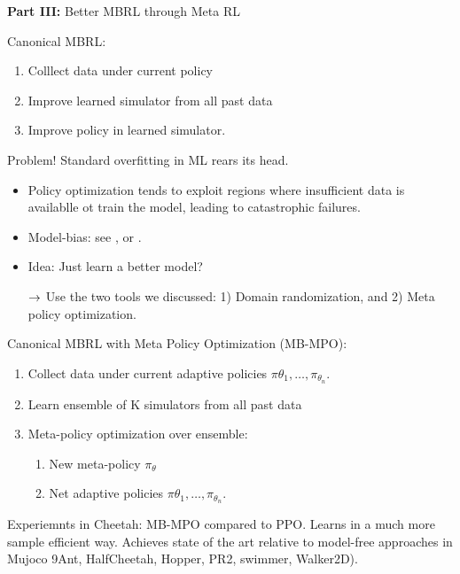 {\bf Part III:} Better MBRL through Meta RL \\


Canonical MBRL:
\begin{enumerate}
    \item Colllect data under current policy
    \item Improve learned simulator from all past data
    \item Improve policy in learned simulator.
\end{enumerate}

Problem! Standard overfitting in ML rears its head.
\begin{itemize}
    \item Policy optimization tends to exploit regions where insufficient data is availablle ot train the model, leading to catastrophic failures.
    
    \item Model-bias: see \citet{atkeson1997comparison}, or \citet{deisenroth2011pilco}.
    \item Idea: Just learn a better model?
    
    $\rightarrow$ Use the two tools we discussed: 1) Domain randomization, and 2) Meta policy optimization.
\end{itemize}

Canonical MBRL with Meta Policy Optimization (MB-MPO):
\begin{enumerate}
    \item Collect data under current adaptive policies $\pi{\theta_1}, \ldots, \pi_{\theta_n}$.
    \item Learn ensemble of K simulators from all past data
    \item Meta-policy optimization over ensemble:
    \begin{enumerate}
        \item New meta-policy $\pi_\theta$
        \item Net adaptive policies $\pi{\theta_1}, \ldots, \pi_{\theta_n}$.
    \end{enumerate}
\end{enumerate}

Experiemnts in Cheetah: MB-MPO compared to PPO. Learns in a much more sample efficient way. Achieves state of the art relative to model-free approaches in Mujoco 9Ant, HalfCheetah, Hopper, PR2, swimmer, Walker2D). \\

